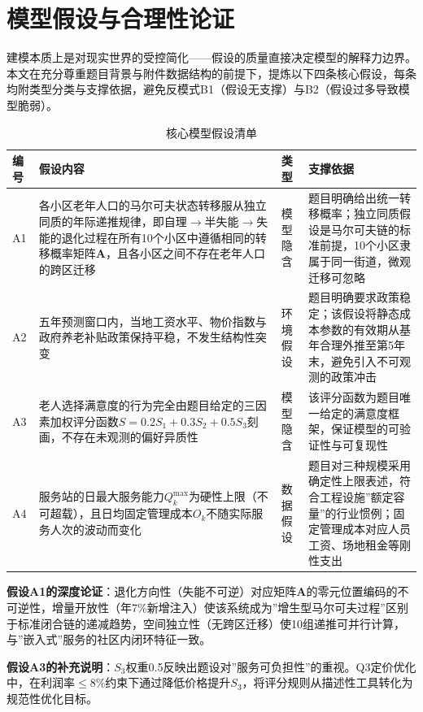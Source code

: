 
\section{模型假设与合理性论证}

建模本质上是对现实世界的受控简化——假设的质量直接决定模型的解释力边界。本文在充分尊重题目背景与附件数据结构的前提下，提炼以下四条核心假设，每条均附类型分类与支撑依据，避免反模式B1（假设无支撑）与B2（假设过多导致模型脆弱）。

\begin{table}[htbp]
\centering
\caption{核心模型假设清单}
\label{tab:assumptions}
\begin{tabular}{p{0.8cm}p{5.5cm}p{2.2cm}p{4.5cm}}
\toprule
\textbf{编号} & \textbf{假设内容} & \textbf{类型} & \textbf{支撑依据} \\
\midrule
A1 & 各小区老年人口的马尔可夫状态转移服从独立同质的年际递推规律，即自理$\to$半失能$\to$失能的退化过程在所有10个小区中遵循相同的转移概率矩阵$\mathbf{A}$，且各小区之间不存在老年人口的跨区迁移 & 模型隐含 & 题目明确给出统一转移概率；独立同质假设是马尔可夫链的标准前提，10个小区隶属于同一街道，微观迁移可忽略 \\
\midrule
A2 & 五年预测窗口内，当地工资水平、物价指数与政府养老补贴政策保持平稳，不发生结构性突变 & 环境假设 & 题目明确要求政策稳定；该假设将静态成本参数的有效期从基年合理外推至第5年末，避免引入不可观测的政策冲击 \\
\midrule
A3 & 老人选择满意度的行为完全由题目给定的三因素加权评分函数$S=0.2S_1+0.3S_2+0.5S_3$刻画，不存在未观测的偏好异质性 & 模型隐含 & 该评分函数为题目唯一给定的满意度框架，保证模型的可验证性与可复现性 \\
\midrule
A4 & 服务站的日最大服务能力$Q_k^{\max}$为硬性上限（不可超载），且日均固定管理成本$O_k$不随实际服务人次的波动而变化 & 数据假设 & 题目对三种规模采用确定性上限表述，符合工程设施”额定容量”的行业惯例；固定管理成本对应人员工资、场地租金等刚性支出 \\
\bottomrule
\end{tabular}
\end{table}

\textbf{假设A1的深度论证}：退化方向性（失能不可逆）对应矩阵$\mathbf{A}$的零元位置编码的不可逆性，增量开放性（年7\%新增注入）使该系统成为”增生型马尔可夫过程”区别于标准闭合链的递减趋势，空间独立性（无跨区迁移）使10组递推可并行计算，与”嵌入式”服务的社区内闭环特征一致。

\textbf{假设A3的补充说明}：$S_3$权重0.5反映出题设对”服务可负担性”的重视。Q3定价优化中，在利润率$\le 8\%$约束下通过降低价格提升$S_3$，将评分规则从描述性工具转化为规范性优化目标。
